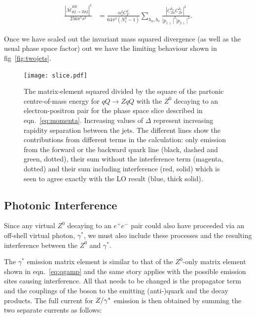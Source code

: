 		\begin{align}
		\begin{split}
			\frac{{|\bar{\mathcal{M}}_{qQ\to ZqQ}^{HE}|}^2}{256\pi^5s^2} &= \frac{\alpha_s^2C_F^2}{64\pi^3(N_c^2-1)}
			\sum_{h_a, h_e}\frac{|C_{Za}^{h_a}C_{Ze}^{h_e}|^2}{|p_{1\perp}|^2|p_{2\perp}|^2}.
			\label{eqn:zLimit}
		\end{split}
		\end{align}

		Once we have scaled out the invariant mass squared divergence (as well as the usual phase
		space factor) out we have the limiting behaviour shown in fig~\eqref{fig:twojets}.

		\begin{figure}[hbt]
		  \begin{center}
		    \texttt{[image: slice.pdf]}
		    \caption{The matrix-element squared divided by the square of the partonic
		      centre-of-mass energy for $qQ\to ZqQ$ with the $Z^0$ decaying to an
		      electron-positron pair for the phase space slice described in
		      eqn.~\eqref{eq:momenta}.  Increasing values of $\Delta$ represent
		      increasing rapidity separation between the jets.  The different lines show the contributions from
		      different terms in the calculation: only emission from the forward or the
		      backward quark line (black, dashed and green, dotted), their sum without
		      the interference term (magenta, dotted) and their sum including
		      interference (red, solid) which is seen to agree exactly with the LO result
		      (blue, thick solid).}
		    \label{fig:twojets}
		  \end{center}
		\end{figure}

	\subsection{Photonic Interference}

		Since any virtual $Z^0$ decaying to an $e^+e^-$ pair could also have proceeded via an off-shell virtual photon,
		$\gamma^*$, we must also include these processes and the resulting interference
		between the $Z^0$ and $\gamma^*$.

		The $\gamma^*$ emission matrix element is similar to that of the $Z^0$-only matrix
		element shown in eqn.~\eqref{eq:qgamp} and the same story applies with the
		possible emission sites causing interference.  All that needs to be changed is the
		propagator term and the couplings of the boson to the emitting (anti-)quark and
		the decay products.  The full current for $Z/\gamma^*$ emission is then obtained by summing
		the two separate currents as follows:


